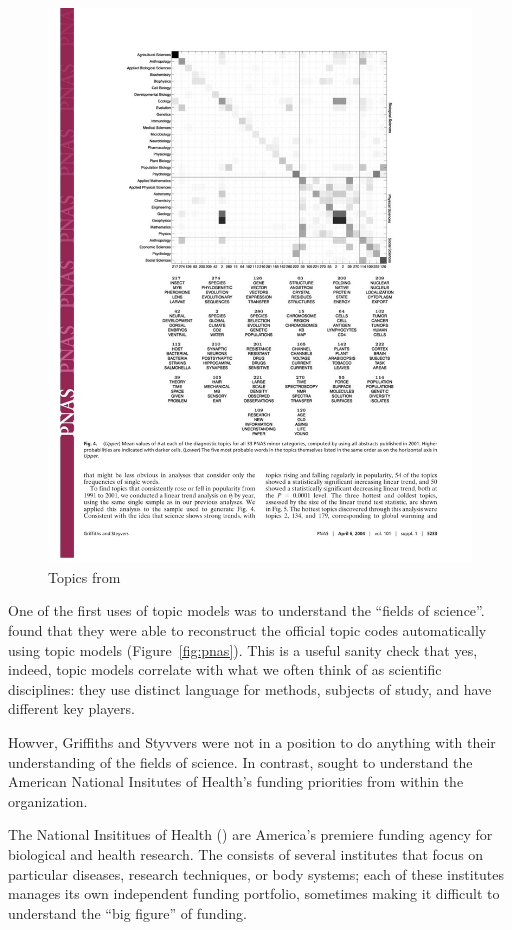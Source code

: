 \begin{figure}
  \includegraphics[width=.8\linewidth]{figures/sci_gs}
  \caption{Topics from }
\end{figure}

One of the first uses of topic models was to understand the ``fields
of science''.  \citet{griffiths-04} found that they were able to
reconstruct the official  topic codes automatically using
topic models (Figure~\ref{fig:pnas}).  This is a useful sanity check
that yes, indeed, topic models correlate with what we often think of
as scientific disciplines: they use distinct language for methods,
subjects of study, and have different key players.

Howver, Griffiths and Styvvers were not in a position to do anything
with their understanding of the fields of science.  In contrast,
\citet{talley-11} sought to understand the American National Insitutes
of Health's funding priorities from within the organization.

The National Insititues of Health () are America's premiere funding
agency for biological and health research.  The  consists of
several institutes that focus on particular diseases, research techniques, or body
systems; each of these institutes manages its own independent funding portfolio,
sometimes making it difficult to understand the ``big figure'' of funding.


